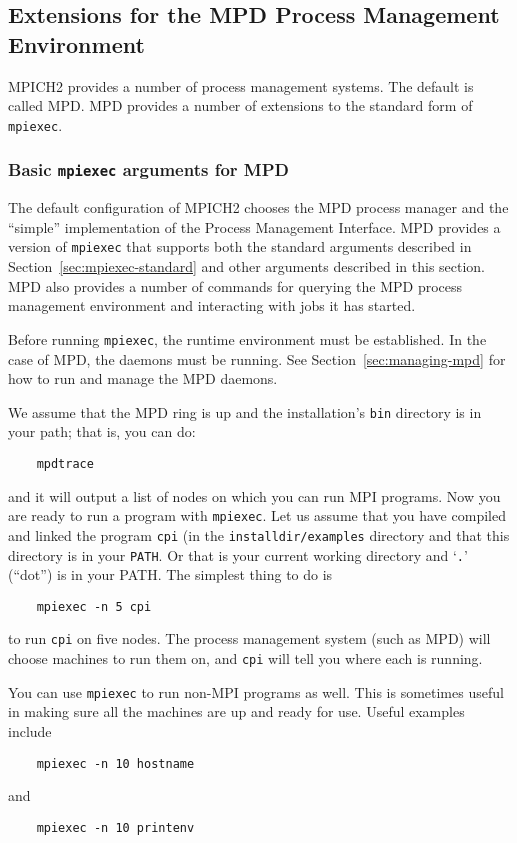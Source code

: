 \documentclass[dvipdfm,11pt]{article}
\begin{document}
\subsection{Extensions for the MPD Process Management Environment}
\label{sec:extensions-various}

MPICH2 provides a number of process management systems.  The default is
called MPD.  MPD provides a number of extensions to the standard form of
\texttt{mpiexec}.

\subsubsection{Basic \texttt{mpiexec} arguments for MPD}
\label{sec:extensions-mpd}

The default configuration of MPICH2 chooses the MPD process manager and
the ``simple'' implementation of the Process Management Interface.
MPD provides a version of
\texttt{mpiexec} that supports both the standard arguments described in
Section~\ref{sec:mpiexec-standard} and other arguments described in this
section.  MPD also provides a number of commands for querying the MPD
process management environment and interacting with jobs it has started. 

Before running \texttt{mpiexec}, the runtime environment must be
established.  In the case of MPD, the daemons must be running.  See
Section~\ref{sec:managing-mpd} for how to run and manage the MPD daemons.

We assume that the MPD ring is up and the installation's \texttt{bin}
directory is in your path; that is, you can do:
\begin{verbatim}
    mpdtrace
\end{verbatim}
and it will output a list of nodes on which you can run MPI programs.
Now you are ready to run a program with \texttt{mpiexec}.  Let us assume
that you have compiled and linked the program \texttt{cpi} (in the
\texttt{installdir/examples} directory and that this directory is in your
\texttt{PATH}.  Or that is your current working directory and
`\texttt{.}' (``dot'') is in your PATH.   The simplest thing to do is
\begin{verbatim}
    mpiexec -n 5 cpi
\end{verbatim}
to run \texttt{cpi} on five nodes.  The process management system (such
as MPD) will choose machines to run them on, and \texttt{cpi} will tell
you where each is running.  

You can use \texttt{mpiexec} to run non-MPI programs as well.  This is
sometimes useful in making sure all the machines are up and ready for
use.  Useful examples include
\begin{verbatim}
    mpiexec -n 10 hostname
\end{verbatim}
and
\begin{verbatim}
    mpiexec -n 10 printenv
\end{verbatim}
\end{document}
